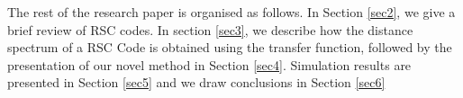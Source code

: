 The rest of the research paper is organised as follows. In Section \ref{sec2}, we give a brief review of RSC codes. In section \ref{sec3}, we describe how the distance spectrum of a RSC Code is obtained using the transfer function, followed by the presentation of our novel method in Section \ref{sec4}. Simulation results are presented in Section \ref{sec5} and we draw conclusions in Section \ref{sec6}